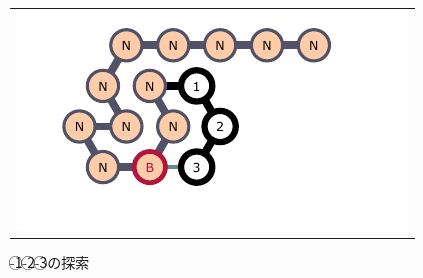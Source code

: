 \documentclass[a4,11pt]{article}
\begin{document}
\begin{figure}[h]
\begin{tabular}{c}
\begin{minipage}{0.33\hsize}
\centering
	\includegraphics[width=\textwidth]{fig/svg/confex1_2.pdf}
\end{minipage}

\end{tabular}
\caption{{-}\textcircled{\scriptsize 1}{-}\textcircled{\scriptsize 2}{-}\textcircled{\scriptsize 3}の探索}
\label{fig:glider1_01}
\end{figure}
\end{document}
